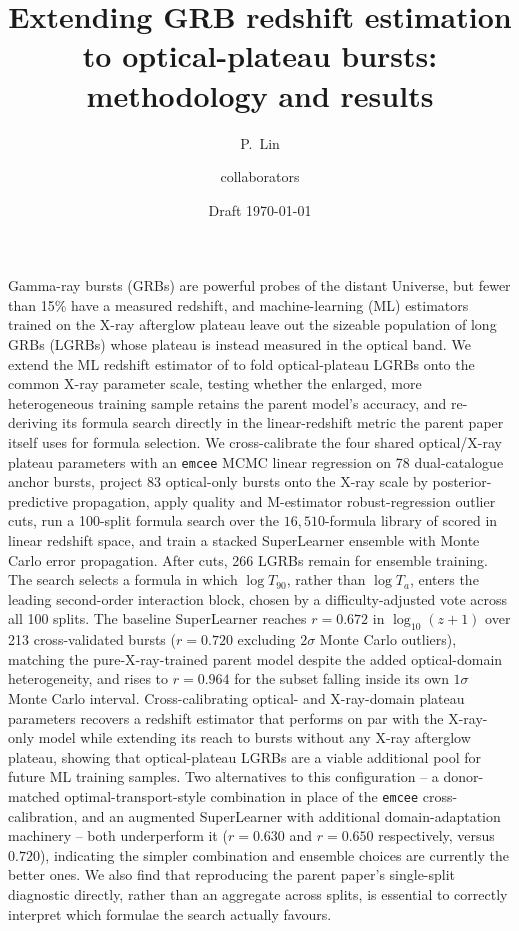 \documentclass{aa}
\newcommand{\Ta}{T_a}
\newcommand{\logz}{\log_{10}(z+1)}
\begin{document}
\title{Extending GRB redshift estimation to optical-plateau bursts:
       methodology and results}
\author{P.~Lin \and collaborators}
\date{Draft \today}

\abstract
{Gamma-ray bursts (GRBs) are powerful probes of the distant Universe, but fewer
 than 15\% have a measured redshift, and machine-learning (ML) estimators
 trained on the X-ray afterglow plateau leave out the sizeable population of
 long GRBs (LGRBs) whose plateau is instead measured in the optical band.}
{We extend the ML redshift estimator of \citet{narendra2025} to fold
 optical-plateau LGRBs onto the common X-ray parameter scale, testing whether
 the enlarged, more heterogeneous training sample retains the parent model's
 accuracy, and re-deriving its formula search directly in the linear-redshift
 metric the parent paper itself uses for formula selection.}
{We cross-calibrate the four shared optical/X-ray plateau parameters with an
 \texttt{emcee} MCMC linear regression on 78 dual-catalogue anchor bursts,
 project 83 optical-only bursts onto the X-ray scale by posterior-predictive
 propagation, apply quality and M-estimator robust-regression outlier cuts,
 run a 100-split formula search over the $16{,}510$-formula library of
 \citet{narendra2025} scored in linear redshift space, and train a stacked
 SuperLearner ensemble with Monte Carlo error propagation.}
{After cuts, 266 LGRBs remain for ensemble training. The search selects a
 formula in which $\log T_{90}$, rather than $\log \Ta$, enters the leading
 second-order interaction block, chosen by a difficulty-adjusted vote across
 all 100 splits. The baseline SuperLearner reaches $r=0.672$ in $\logz$ over
 213 cross-validated bursts ($r=0.720$ excluding $2\sigma$ Monte Carlo
 outliers), matching the pure-X-ray-trained parent model despite the added
 optical-domain heterogeneity, and rises to $r=0.964$ for the subset falling
 inside its own $1\sigma$ Monte Carlo interval.}
{Cross-calibrating optical- and X-ray-domain plateau parameters recovers a
 redshift estimator that performs on par with the X-ray-only model while
 extending its reach to bursts without any X-ray afterglow plateau, showing
 that optical-plateau LGRBs are a viable additional pool for future ML
 training samples. Two alternatives to this configuration -- a donor-matched
 optimal-transport-style combination in place of the \texttt{emcee}
 cross-calibration, and an augmented SuperLearner with additional
 domain-adaptation machinery -- both underperform it ($r=0.630$ and $r=0.650$
 respectively, versus $0.720$), indicating the simpler combination and ensemble
 choices are currently the better ones. We also find that reproducing the
 parent paper's single-split diagnostic directly, rather than an aggregate
 across splits, is essential to correctly interpret which formulae the search
 actually favours.}
\end{document}
